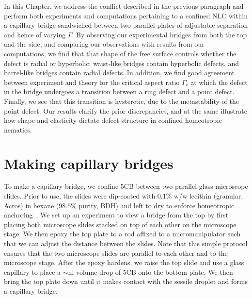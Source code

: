 In this Chapter, we address the conflict described in the previous paragraph and perform both experiments and computations pertaining to a confined NLC within a capillary bridge sandwiched between two parallel plates of adjustable separation and hence of varying $\Gamma$.
By observing our experimental bridges from both the top and the side, and comparing our observations with results from our computations, we find that that shape of the free surface controls whether the defect is radial or hyperbolic: waist-like bridges contain hyperbolic defects, and barrel-like bridges contain radial defects.
In addition, we find good agreement between experiment and theory for the critical aspect ratio $\Gamma_c$ at which the defect in the bridge undergoes a transition between a ring defect and a point defect.
Finally, we see that this transition is hysteretic, due to the metastability of the point defect.
Our results clarify the prior discrepancies, and at the same illustrate how shape and elasticity dictate defect structure in confined homeotropic nematics.




\section{Making capillary bridges}
To make a capillary bridge, we confine 5CB between two parallel glass microscope slides.
Prior to use, the slides were dip-coated with $0.1\%$ w/w lecithin (granular, Acros) in hexane ($98.5\%$ purity, BDH) and left to dry to enforce homeotropic anchoring~\cite{RN140}.
We set up an experiment to view a bridge from the top by first placing both microscope slides stacked on top of each other on the microscope stage.
We then epoxy the top plate to a rod affixed to a micromanipulator such that we can adjust the distance between the slides.
Note that this simple protocol ensures that the two microscope slides are parallel to each other and to the microscope stage.
After the epoxy hardens, we raise the top slide and use a glass capillary to place a $\sim$nl-volume drop of 5CB onto the bottom plate.
We then bring the top plate down until it makes contact with the sessile droplet and forms a capillary bridge.

